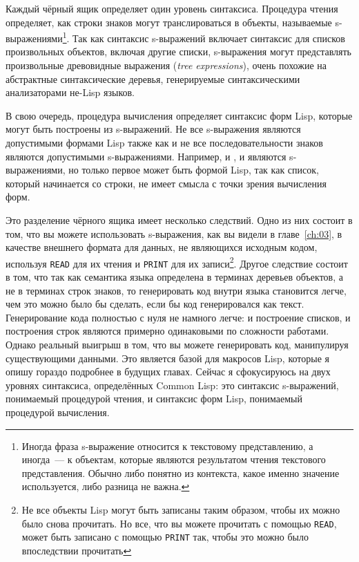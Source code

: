 Каждый чёрный ящик определяет один уровень синтаксиса. Процедура чтения определяет, как
строки знаков могут транслироваться в объекты, называемые s-выражениями\footnote{Иногда
  фраза s-выражение относится к текстовому представлению, а иногда~--- к объектам, которые
  являются результатом чтения текстового представления. Обычно либо понятно из контекста,
  какое именно значение используется, либо разница не важна.}. Так как синтаксис
s-выражений включает синтаксис для списков произвольных объектов, включая другие списки,
s-выражения могут представлять произвольные древовидные выражения (\textit{tree
  expressions}), очень похожие на абстрактные синтаксические деревья, генерируемые
синтаксическими анализаторами не-Lisp языков.

В свою очередь, процедура вычисления определяет синтаксис форм Lisp, которые могут быть
построены из s-выражений. Не все s-выражения являются допустимыми формами Lisp также как и
не все последовательности знаков являются допустимыми s-выражениями. Например, и
, и  являются s-выражениями, но только первое может быть
формой Lisp, так как список, который начинается со строки, не имеет смысла с точки зрения
вычисления форм.

Это разделение чёрного ящика имеет несколько следствий. Одно из них состоит в том, что вы
можете использовать s-выражения, как вы видели в главе~\ref{ch:03}, в качестве внешнего формата для
данных, не являющихся исходным кодом, используя \lstinline{READ} для их чтения и
\lstinline{PRINT} для их записи\footnote{Не все объекты Lisp могут быть записаны таким
  образом, чтобы их можно было снова прочитать. Но все, что вы можете прочитать с помощью
  \lstinline{READ}, может быть записано с помощью \lstinline{PRINT} так, чтобы это можно было
  впоследствии прочитать}. Другое следствие состоит в том, что так как семантика языка
определена в терминах деревьев объектов, а не в терминах строк знаков, то генерировать код
внутри языка становится легче, чем это можно было бы сделать, если бы код генерировался
как текст. Генерирование кода полностью с нуля не намного легче: и построение списков, и
построения строк являются примерно одинаковыми по сложности работами. Однако реальный
выигрыш в том, что вы можете генерировать код, манипулируя существующими данными. Это
является базой для макросов Lisp, которые я опишу гораздо подробнее в будущих
главах. Сейчас я сфокусируюсь на двух уровнях синтаксиса, определённых Common Lisp: это
синтаксис s-выражений, понимаемый процедурой чтения, и синтаксис форм Lisp, понимаемый
процедурой вычисления.

